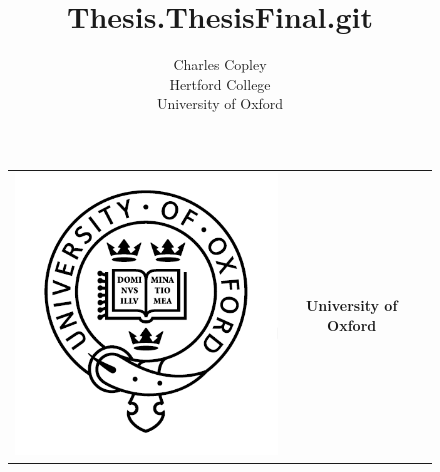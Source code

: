 \documentclass[english,a4paper,titlepage,12pt]{report}
\author{Charles Copley\\Hertford College\\University of Oxford}
\title{Thesis.ThesisFinal.git}
\begin{document}
%
\pagestyle{empty}
\begin{center}

\begin{figure}[ht]
\centering
\begin{tabular}{ccc}
\begin{minipage}{3cm}
\includegraphics[scale=0.25]{./images/logos/OxfordLogo.png}
\end{minipage}
&
\begin{minipage}{9cm}
\centering
\textbf{\large University of Oxford}
\vspace{1 cm}


\end{minipage}
\end{tabular}
\end{figure}
\end{center}
\end{document}
